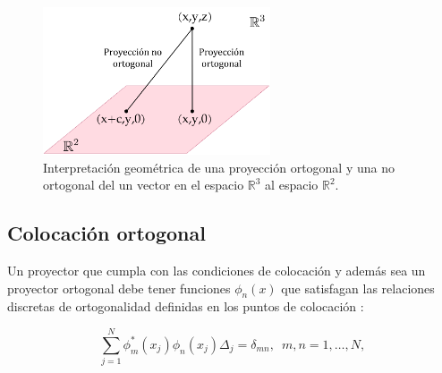 \begin{figure}[ht]
  \centering
\includegraphics[width=0.6\textwidth]{./img/projortoandnon.drawio.png}
\caption{Interpretación geométrica de una proyección ortogonal y una no ortogonal del un vector en el espacio $\mathbb{R}^3$ al espacio $\mathbb{R}^2$. }
\label{fig:projortoandnon}
\end{figure}

\subsection{Colocación ortogonal}

Un proyector que cumpla con las condiciones de colocación y además sea un proyector ortogonal debe tener funciones $\phi_n(x)$ que satisfagan las relaciones discretas de ortogonalidad definidas en los puntos de colocación \cite{Tannor:2006}:

\begin{equation}
  \label{eq:ortox2}
  \sum_{j=1}^N \phi_m^*(x_j)\phi_n(x_j)\Delta_j = \delta_{mn}, \,\,\, m,n=1,\dots,N,
\end{equation}

